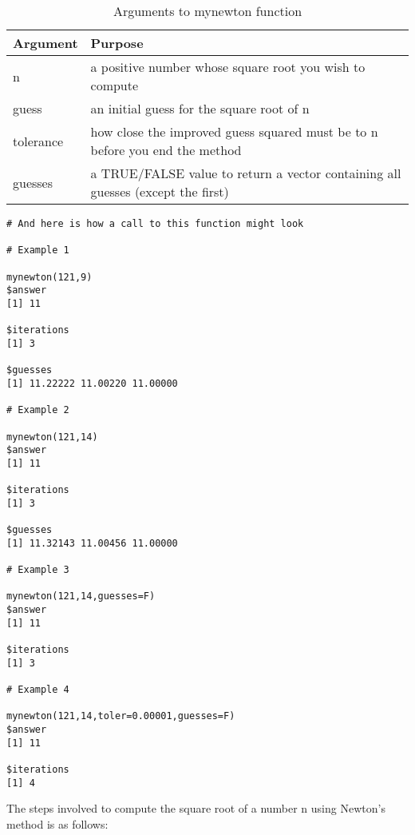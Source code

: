 \documentclass{article}
\begin{document}
\begin{table}[ht]
\caption{Arguments to mynewton function}
\begin{tabular}{l | l}
\hline
Argument & Purpose \\ [1ex]
\hline
n & a positive number whose square root you wish to compute \\ [1ex]
\hline 
guess & an initial guess for the square root of n \\ [1ex]
\hline
tolerance & how close the improved guess squared must be to n before you end the method \\ [1ex]
\hline 
guesses & a TRUE/FALSE value to return a vector containing all guesses (except the first) \\ [1ex]
\hline
\end{tabular}
\label{table:nonlin}
\end{table}

\begin{verbatim}
# And here is how a call to this function might look

# Example 1

mynewton(121,9)
$answer
[1] 11

$iterations
[1] 3

$guesses
[1] 11.22222 11.00220 11.00000

# Example 2

mynewton(121,14)
$answer
[1] 11

$iterations
[1] 3

$guesses
[1] 11.32143 11.00456 11.00000

# Example 3

mynewton(121,14,guesses=F)
$answer
[1] 11

$iterations
[1] 3

# Example 4

mynewton(121,14,toler=0.00001,guesses=F)
$answer
[1] 11

$iterations
[1] 4

\end{verbatim}

The steps involved to compute the square root of a number n using Newton's method is as follows:
\end{document}
